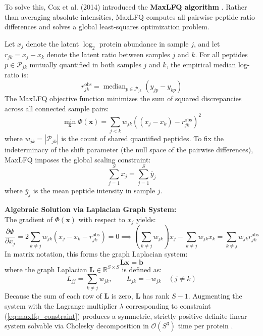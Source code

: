 \documentclass[11pt,oneside]{book}
\begin{document}
To solve this, Cox et al. (2014) introduced the \textbf{MaxLFQ algorithm} \cite{cox2014maxlfq}. Rather than averaging absolute intensities, MaxLFQ computes all pairwise peptide ratio differences and solves a global least-squares optimization problem. 

Let $x_j$ denote the latent $\log_2$ protein abundance in sample $j$, and let $r_{jk} = x_j - x_k$ denote the latent ratio between samples $j$ and $k$. For all peptides $p \in \mathcal{P}_{jk}$ mutually quantified in both samples $j$ and $k$, the empirical median log-ratio is:
\begin{equation}
r_{jk}^{\text{obs}} = \operatorname{median}_{p \in \mathcal{P}_{jk}} \left( y_{jp} - y_{kp} \right)
\label{eq:maxlfq_observed_ratio}
\end{equation}
The MaxLFQ objective function minimizes the sum of squared discrepancies across all connected sample pairs:
\begin{equation}
\min_{\mathbf{x}} \Phi(\mathbf{x}) = \sum_{j < k} w_{jk} \left( (x_j - x_k) - r_{jk}^{\text{obs}} \right)^2
\label{eq:maxlfq_objective}
\end{equation}
where $w_{jk} = |\mathcal{P}_{jk}|$ is the count of shared quantified peptides. To fix the indeterminacy of the shift parameter (the null space of the pairwise differences), MaxLFQ imposes the global scaling constraint:
\begin{equation}
\sum_{j=1}^S x_j = \sum_{j=1}^S \bar{y}_j
\label{eq:maxlfq_constraint}
\end{equation}
where $\bar{y}_j$ is the mean peptide intensity in sample $j$.

\begin{deepdive}
\textbf{Algebraic Solution via Laplacian Graph System:}\\
The gradient of $\Phi(\mathbf{x})$ with respect to $x_j$ yields:
\begin{equation}
\frac{\partial \Phi}{\partial x_j} = 2 \sum_{k \neq j} w_{jk} \left( x_j - x_k - r_{jk}^{\text{obs}} \right) = 0 \implies \left( \sum_{k \neq j} w_{jk} \right) x_j - \sum_{k \neq j} w_{jk} x_k = \sum_{k \neq j} w_{jk} r_{jk}^{\text{obs}}
\end{equation}
In matrix notation, this forms the graph Laplacian system:
\begin{equation}
\mathbf{L} \mathbf{x} = \mathbf{b}
\label{eq:laplacian_system}
\end{equation}
where the graph Laplacian $\mathbf{L} \in \mathbb{R}^{S \times S}$ is defined as:
\begin{equation}
L_{jj} = \sum_{k \neq j} w_{jk}, \qquad L_{jk} = -w_{jk} \quad (j \neq k)
\end{equation}
Because the sum of each row of $\mathbf{L}$ is zero, $\mathbf{L}$ has rank $S - 1$. Augmenting the system with the Lagrange multiplier $\lambda$ corresponding to constraint (\ref{eq:maxlfq_constraint}) produces a symmetric, strictly positive-definite linear system solvable via Cholesky decomposition in $\mathcal{O}(S^3)$ time per protein \cite{cox2014maxlfq}.
\end{deepdive}
\end{document}
